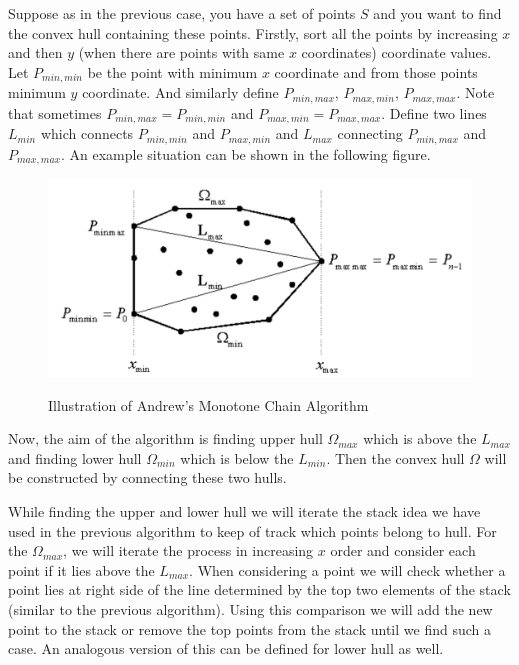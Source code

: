 \documentclass[12pt]{article}
\begin{document}
Suppose as in the previous case, you have a set of points $S$ and you want to 
find the convex hull containing these points. Firstly, sort all the points
by increasing $x$ and then $y$ (when there are points with same $x$ coordinates) 
coordinate values. Let $P_{min,min}$ be the point with minimum $x$ coordinate and 
from those points minimum $y$ coordinate. And similarly define $P_{min,max}$,
$P_{max,min}$, $P_{max,max}$. Note that sometimes $P_{min,max} = P_{min,min}$
and $P_{max,min} = P_{max,max}$. Define two lines $L_{min}$ which connects 
$P_{min,min}$ and $P_{max,min}$ and $L_{max}$ connecting $P_{min,max}$ and $P_{max,max}$.
An example situation can be shown in the following figure.

\begin{center}
  \begin{figure}[!htb]
    \centering
    \includegraphics[width=.7\linewidth]{figures/fig16.png}
    \label{fig:17}
    \caption{Illustration of Andrew's Monotone Chain Algorithm}
  \end{figure}
\end{center}

Now, the aim of the algorithm is finding upper hull $\Omega_{max}$ which is above the $L_{max}$
and finding lower hull $\Omega_{min}$ which is below the $L_{min}$. Then the 
convex hull $\Omega$ will be constructed by connecting these two hulls.

While finding the upper and lower hull we will iterate the stack idea we have used in
the previous algorithm to keep of track which points belong to hull. For the $\Omega_{max}$,
we will iterate the process in increasing $x$ order and consider each point if it lies above the
$L_{max}$. When considering a point we will check whether a point lies at right
side of the line determined by the top two elements of the stack (similar to the previous algorithm).
Using this comparison we will add the new point to the stack or remove the top points 
from the stack until we find such a case. An analogous version of this can be defined for lower hull as well.
\end{document}
